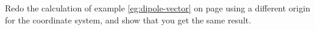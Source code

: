 Redo the calculation of example \ref{eg:dipole-vector} on page
\pageref{eg:dipole-vector} using a different origin for the coordinate system,
and show that you get the same result.
